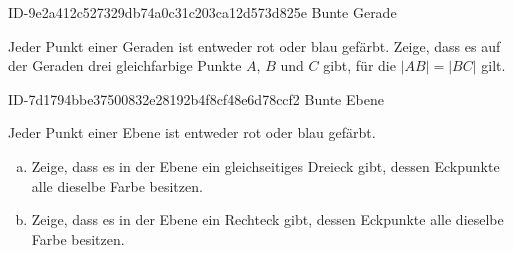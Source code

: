 \begin{exercise}
      {ID-9e2a412c527329db74a0c31c203ca12d573d825e}
      {Bunte Gerade}
  \ifproblem\problem\par
    Jeder Punkt einer Geraden ist entweder rot
    oder blau gefärbt. Zeige, dass es auf der
    Geraden drei gleichfarbige Punkte $A$,
    $B$ und $C$ gibt, für die $|AB|=|BC|$ gilt.
  \fi
\end{exercise}

\begin{exercise}
      {ID-7d1794bbe37500832e28192b4f8cf48e6d78ccf2}
      {Bunte Ebene}
  \ifproblem\problem\par
    Jeder Punkt einer Ebene ist entweder rot oder
    blau gefärbt.
    \begin{enumerate}[a)]
      \item Zeige, dass es in der Ebene ein
            gleichseitiges Dreieck gibt, dessen
            Eckpunkte alle dieselbe Farbe besitzen.
      \item Zeige, dass es in der Ebene ein
            Rechteck gibt, dessen Eckpunkte alle
            dieselbe Farbe besitzen.
    \end{enumerate}
  \fi
\end{exercise}



